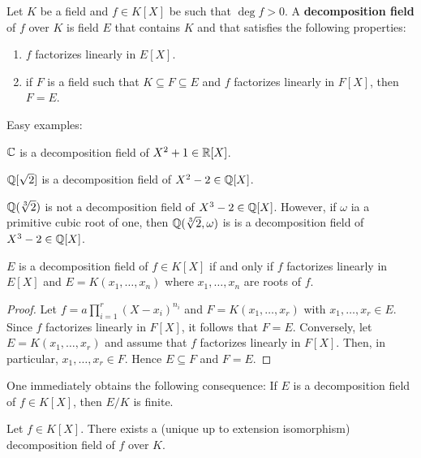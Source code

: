 
\begin{definition}
	Let $K$ be a field and $f\in K[X]$ be such that $\deg f>0$. A \textbf{decomposition field}
	of $f$ over $K$ is field $E$ that contains $K$ and that satisfies the following properties:
	\begin{enumerate}
		\item $f$ factorizes linearly in $E[X]$. 
		\item if $F$ is a field such that $K\subseteq F\subseteq E$ and 
			$f$ factorizes
			linearly in $F[X]$, then $F=E$. 
	\end{enumerate}
\end{definition}

Easy examples: 

\begin{example}
	$\mathbb{C}$ is a decomposition field of $X^2+1\in\mathbb{R}[X]$. 
\end{example}

\begin{example}
	$\mathbb{Q}[\sqrt{2}]$ is a decomposition field of $X^2-2\in\mathbb{Q}[X]$. 
\end{example}

\begin{example}
	$\mathbb{Q}(\sqrt[3]{2})$ is not a decomposition field of $X^3-2\in\mathbb{Q}[X]$. However, if
	$\omega$ ia a primitive cubic root of one, then 
	$\mathbb{Q}(\sqrt[3]{2},\omega)$ is is a decomposition field of $X^3-2\in\mathbb{Q}[X]$. 
\end{example}

\begin{proposition}
	$E$ is a decomposition field of $f\in K[X]$ if and only if
	$f$ factorizes linearly in $E[X]$ and $E=K(x_1,\dots,x_n)$ where 
	$x_1,\dots,x_n$ are roots of $f$. 
\end{proposition}

\begin{proof}
    Let $f=a\prod_{i=1}^r(X-x_i)^{n_i}$ and $F=K(x_1,\dots,x_r)$ with $x_1,\dots,x_r\in E$. Since $f$
    factorizes linearly in $F[X]$, it follows that $F=E$. 
    Conversely, let $E=K(x_1,\dots,x_r)$ and assume that $f$ factorizes linearly
    in $F[X]$. Then, in particular, $x_1,\dots,x_r\in F$. Hence $E\subseteq F$ and
    $F=E$. 
\end{proof}

One immediately obtains the following consequence:
If $E$ is a decomposition field of $f\in K[X]$, then $E/K$ is finite. 

\begin{theorem}
    Let $f\in K[X]$. There exists a (unique up to extension isomorphism) 
    decomposition field of $f$ over $K$. 
\end{theorem}

